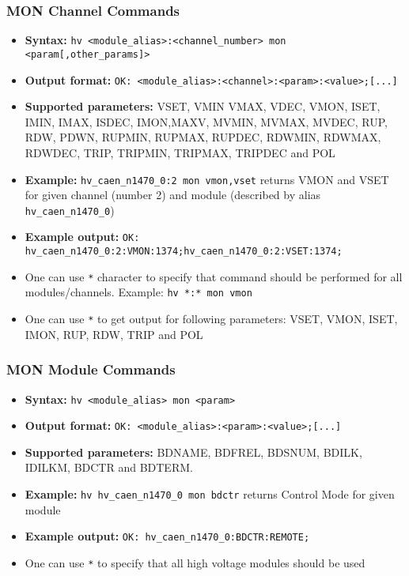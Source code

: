 \dotfill

\subsubsection*{MON Channel Commands}
\begin{itemize}
\item \textbf{Syntax:} \lstinline{hv <module_alias>:<channel_number> mon <param[,other_params]>}
\item \textbf{Output format:} \lstinline{OK: <module_alias>:<channel>:<param>:<value>;[...]}
\item \textbf{Supported parameters:} VSET, VMIN VMAX, VDEC, VMON, ISET, IMIN, IMAX, ISDEC, IMON,MAXV, MVMIN, MVMAX, MVDEC, RUP, RDW, PDWN, RUPMIN, RUPMAX, RUPDEC, RDWMIN, RDWMAX, RDWDEC, TRIP, TRIPMIN, TRIPMAX, TRIPDEC and POL
\item \textbf{Example:} \lstinline{hv_caen_n1470_0:2 mon vmon,vset} returns VMON and VSET for given channel (number 2) and module (described by alias \lstinline{hv_caen_n1470_0})
\item \textbf{Example output:} \lstinline{OK: hv_caen_n1470_0:2:VMON:1374;hv_caen_n1470_0:2:VSET:1374;}
\item One can use \lstinline{*} character to specify that command should be performed for all modules/channels. Example: \lstinline{hv *:* mon vmon}
\item One can use \lstinline{*} to get output for following parameters: VSET, VMON, ISET, IMON, RUP, RDW, TRIP and POL
\end{itemize}

\dotfill

\subsubsection*{MON Module Commands}
\begin{itemize}
\item \textbf{Syntax:} \lstinline{hv <module_alias> mon <param>}
\item \textbf{Output format:} \lstinline{OK: <module_alias>:<param>:<value>;[...]}
\item \textbf{Supported parameters:} BDNAME, BDFREL, BDSNUM, BDILK, IDILKM, BDCTR and BDTERM.
\item \textbf{Example:} \lstinline{hv hv_caen_n1470_0 mon bdctr} returns Control Mode for given module
\item \textbf{Example output:} \lstinline{OK: hv_caen_n1470_0:BDCTR:REMOTE;}
\item One can use \lstinline{*} to specify that all high voltage modules should be used
\end{itemize}

